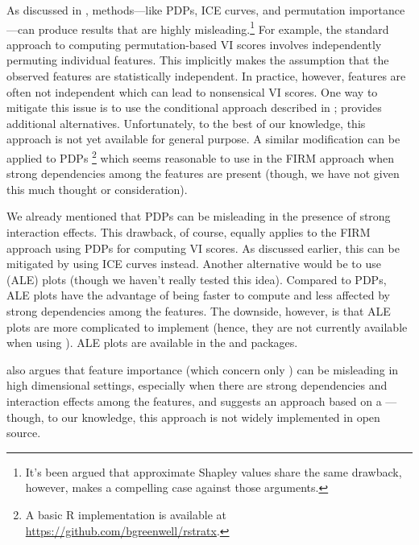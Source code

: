 As discussed in \citet{hooker-2019-stop}, 
methods---like PDPs, ICE curves, and permutation importance---can
produce results that are highly misleading.\footnote{It's been argued
  that approximate Shapley values share the same drawback, however,
  \citet{janzing-2019-feature} makes a compelling case against those
  arguments.} For example, the standard approach to computing
permutation-based VI scores involves independently permuting individual
features. This implicitly makes the assumption that the observed
features are statistically independent. In practice, however, features
are often not independent which can lead to nonsensical VI scores. One
way to mitigate this issue is to use the conditional approach described
in \citet{strobl-2019-conditional}; \citet{hooker-2019-stop} provides
additional alternatives. Unfortunately, to the best of our knowledge,
this approach is not yet available for general purpose. A similar
modification can be applied to PDPs
\citep{parr-2019-technical}\footnote{A basic R implementation is
  available at \url{https://github.com/bgreenwell/rstratx}.} which seems
reasonable to use in the FIRM approach when strong dependencies among
the features are present (though, we have not given this much thought or
consideration).

We already mentioned that PDPs can be misleading in the presence of
strong interaction effects. This drawback, of course, equally applies to
the FIRM approach using PDPs for computing VI scores. As discussed
earlier, this can be mitigated by using ICE curves instead. Another
alternative would be to use  (ALE) plots
\citep{apley-2016-visualizing} (though we haven't really tested this
idea). Compared to PDPs, ALE plots have the advantage of being faster to
compute and less affected by strong dependencies among the features. The
downside, however, is that ALE plots are more complicated to implement
(hence, they are not currently available when using
). ALE plots are available in the
 \citep{R-ALEPlot} and  packages.

\citet{hooker-2007-generalized} also argues that feature importance
(which concern only ) can be misleading in high
dimensional settings, especially when there are strong dependencies and
interaction effects among the features, and suggests an approach based
on a ---though, to our
knowledge, this approach is not widely implemented in open source.

